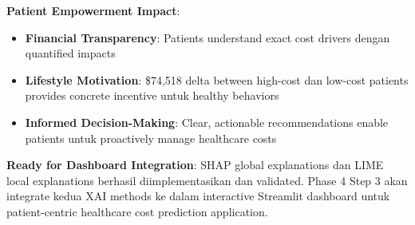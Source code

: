 \textbf{Patient Empowerment Impact}:
\begin{itemize}
    \item \textbf{Financial Transparency}: Patients understand exact cost drivers dengan quantified impacts
    \item \textbf{Lifestyle Motivation}: \$74,518 delta between high-cost dan low-cost patients provides concrete incentive untuk healthy behaviors
    \item \textbf{Informed Decision-Making}: Clear, actionable recommendations enable patients untuk proactively manage healthcare costs
\end{itemize}

\textbf{Ready for Dashboard Integration}: SHAP global explanations dan LIME local explanations berhasil diimplementasikan dan validated. Phase 4 Step 3 akan integrate kedua XAI methods ke dalam interactive Streamlit dashboard untuk patient-centric healthcare cost prediction application.

